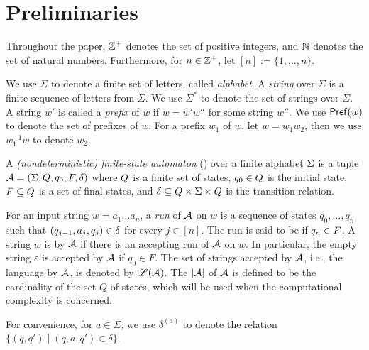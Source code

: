 
\section{Preliminaries}\label{sec:prel}

Throughout the paper, $\mathbb{Z}^+$ denotes the set of positive integers, and  $\mathbb{N}$ denotes the set of natural numbers. Furthermore, for $n\in \mathbb{Z}^+$, let $[n]:=\{1, \ldots, n\}$. 

We use $\Sigma$ to denote a finite set of letters, called \emph{alphabet}. A \emph{string} over $\Sigma$ is a finite sequence of letters from $\Sigma$. We use $\Sigma^*$ to denote the set of strings over $\Sigma$. A string $w'$ is called a \emph{prefix} of $w$ if $w = w'w''$ for some string $w''$. We use $\mathsf{Pref}(w)$ to denote the set of prefixes of $w$. For a prefix $w_1$ of $w$, let $w = w_1 w_2$, then we use $w_1^{-1}w$ to denote $w_2$.

\begin{definition} \label{def:nfa}
	A \emph{(nondeterministic) finite-state automaton}
	(\FA{}) over a finite alphabet $\Sigma$ is a tuple $\mathcal{A} =
	(\Sigma, Q, q_0, F, \delta)$ where 
	$Q$ is a finite set of 
	states, $q_0\in Q$ is
	the initial state, $F\subseteq Q$ is a set of final states, and 
	$\delta\subseteq Q \times 
	\Sigma \times  Q$ is the
	transition relation. 
\end{definition}

For an input string $w=a_1 \dots a_n$, a \emph{run} of $\mathcal{A}$ on $w$
is a sequence of states $q_0, \ldots, q_n$ such that $(q_{j-1}, a_{j}, q_{j}) \in
\delta$  for every $j \in [n]$.
The run is said to be  if $q_n \in F$.
A string $w$ is  by $\mathcal{A}$ if there is an accepting run of
$\mathcal{A}$ on $w$. In particular, the empty string $\varepsilon$ is accepted by $\mathcal{A}$ if $q_0 \in F$. The set of strings accepted by $\mathcal{A}$, i.e., the language  by $\mathcal{A}$, is denoted by $\mathscr{L}(\mathcal{A})$.
The  $|\mathcal{A}|$ of $\mathcal{A}$ is defined to be the cardinality of the set $Q$ of states, which will be 
used when the computational complexity is concerned.

For convenience, for $a \in \Sigma$, we use $\delta^{(a)}$ to denote the  relation $\{(q, q') \mid (q, a, q') \in \delta\}$.


